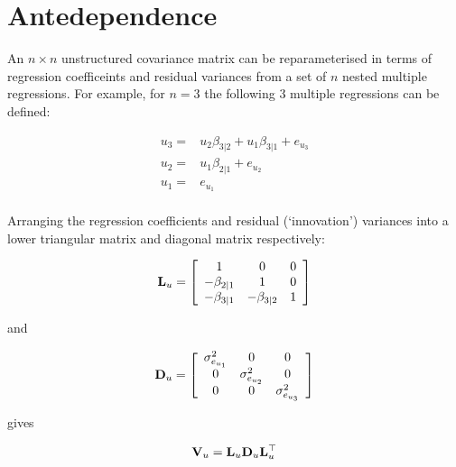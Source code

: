 \documentclass{article}
\begin{document}
\section{Antedependence}

An $n\times n$ unstructured covariance matrix can be reparameterised in terms of regression coefficeints and residual variances from a set of $n$ nested multiple regressions. For example, for $n=3$ the following 3 multiple regressions can be defined:

\begin{equation}
\begin{array}{rl}
u_{3} =&  u_{2}\beta_{3|2}+u_{1}\beta_{3|1}+e_{u_{3}}\\ 
u_{2} =&  u_{1}\beta_{2|1}+e_{u_{2}}\\ 
u_{1} =&  e_{u_{1}}\\ 
\end{array}
\end{equation}

Arranging the regression coefficients and residual (`innovation') variances into a lower triangular matrix and diagonal matrix respectively:

\begin{equation}
{\bf L}_{u}=
\left[
\begin{array}{ccc}
1&0&0\\
-\beta_{2|1}&1&0\\
-\beta_{3|1}&-\beta_{3|2}&1\\
\end{array}
\right]
\end{equation} 

and 

\begin{equation}
{\bf D}_{u}=
\left[
\begin{array}{ccc}
\sigma^{2}_{e_{u_{1}}}&0&0\\
0&\sigma^{2}_{e_{u_{2}}}&0\\
0&0&\sigma^{2}_{e_{u_{3}}}\\
\end{array}
\right]
\end{equation} 


gives

\begin{equation}
{\bf V}_{u} =  {\bf L}_{u}{\bf D}_{u}{\bf L}_{u}^{\top}
\end{equation}
\end{document}
